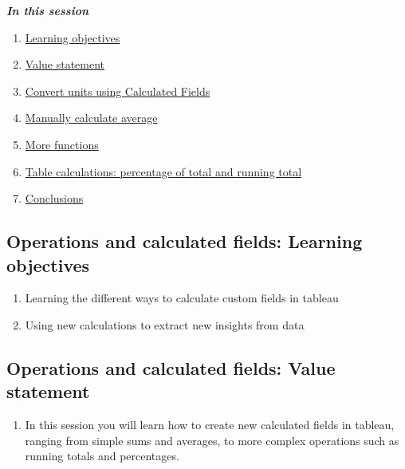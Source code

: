 \documentclass[
]{book}
\providecommand{\tightlist}{%
  \setlength{\itemsep}{0pt}\setlength{\parskip}{0pt}}
\begin{document}
\textbf{\emph{In this session}}

\begin{enumerate}
\def\labelenumi{\arabic{enumi}.}
\tightlist
\item
  \protect\hyperlink{operations-and-calculated-fields-learning-objectives}{Learning objectives}
\item
  \protect\hyperlink{operations-and-calculated-fields-value-statement}{Value statement}
\item
  \protect\hyperlink{convert-unites-using-calculated-fields}{Convert units using Calculated Fields}
\item
  \protect\hyperlink{manually-calculate-average}{Manually calculate average}
\item
  \protect\hyperlink{more-funtions}{More functions}
\item
  \protect\hyperlink{table-calculations--percentage-of-total-and-running-total}{Table calculations: percentage of total and running total}
\item
  \protect\hyperlink{conclusions}{Conclusions}
\end{enumerate}

\hypertarget{operations-and-calculated-fields-learning-objectives}{%
\subsection{Operations and calculated fields: Learning objectives}\label{operations-and-calculated-fields-learning-objectives}}

\begin{enumerate}
\def\labelenumi{\arabic{enumi}.}
\tightlist
\item
  Learning the different ways to calculate custom fields in tableau
\item
  Using new calculations to extract new insights from data
\end{enumerate}

\hypertarget{operations-and-calculated-fields-value-statement}{%
\subsection{Operations and calculated fields: Value statement}\label{operations-and-calculated-fields-value-statement}}

\begin{enumerate}
\def\labelenumi{\arabic{enumi}.}
\tightlist
\item
  In this session you will learn how to create new calculated fields in tableau, ranging from simple sums and averages, to more complex operations such as running totals and percentages.
\end{enumerate}
\end{document}
